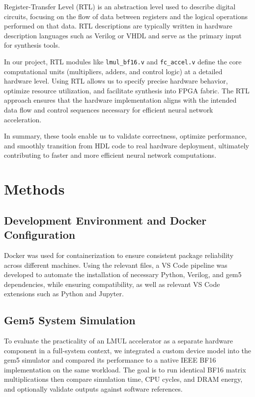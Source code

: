 \documentclass[12pt,letterpaper]{article}
\begin{document}
Register-Transfer Level (RTL) is an abstraction level used to describe digital circuits, focusing on the flow of data between registers and the logical operations performed on that data. RTL descriptions are typically written in hardware description languages such as Verilog or VHDL and serve as the primary input for synthesis tools.

In our project, RTL modules like \texttt{lmul\_bf16.v} and \texttt{fc\_accel.v} define the core computational units (multipliers, adders, and control logic) at a detailed hardware level. Using RTL allows us to specify precise hardware behavior, optimize resource utilization, and facilitate synthesis into FPGA fabric. The RTL approach ensures that the hardware implementation aligns with the intended data flow and control sequences necessary for efficient neural network acceleration.

\vspace{1em}
In summary, these tools enable us to validate correctness, optimize performance, and smoothly transition from HDL code to real hardware deployment, ultimately contributing to faster and more efficient neural network computations.

\section{Methods}

\subsection{Development Environment and Docker Configuration}

Docker was used for containerization to ensure consistent package reliability across different machines. Using the relevant files, a VS Code pipeline was developed to automate the installation of necessary Python, Verilog, and gem5 dependencies, while ensuring compatibility, as well as relevant VS Code extensions such as Python and Jupyter.

\subsection{Gem5 System Simulation}
\label{subsec:gem5}

To evaluate the practicality of an LMUL accelerator as a separate hardware component in a full-system context, we integrated a custom device model into the gem5 simulator and compared its performance to a native IEEE BF16 implementation on the same workload. The goal is to run identical BF16 matrix multiplications then compare simulation time, CPU cycles, and DRAM energy, and optionally validate outputs against software references.
\end{document}
